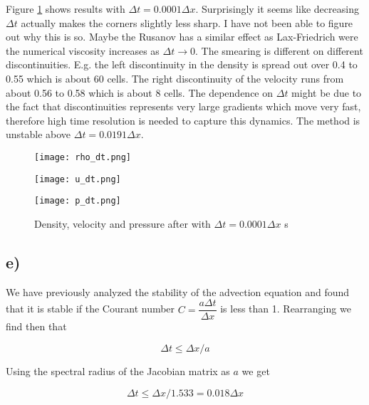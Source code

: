 \documentclass{article}
\begin{document}
Figure \ref{fig:dt} shows results with $\Delta t = 0.0001\Delta x$. Surprisingly it seems like decreasing $\Delta t$ actually makes the corners slightly less sharp. I have not been able to figure out why this is so. Maybe the Rusanov has a similar effect as Lax-Friedrich were the numerical viscosity increases as $\Delta t \rightarrow 0$. The smearing is different on different discontinuities. E.g. the left discontinuity in the density is spread out over 0.4 to 0.55 which is about 60 cells. The right discontinuity of the velocity runs from about 0.56 to 0.58 which is about 8 cells. The dependence on $\Delta t$ might be due to the fact that discontinuities represents very large gradients which move very fast, therefore high time resolution is needed to capture this dynamics. The method is unstable above $\Delta t = 0.0191\Delta x$.

\begin{figure}
	\centering
	\begin{minipage}{0.45\textwidth}
		\texttt{[image: rho\_dt.png]}
	\end{minipage} \hfill
	\begin{minipage}{0.45\textwidth}
		\texttt{[image: u\_dt.png]}
	\end{minipage}	
	\begin{minipage}{0.45\textwidth}
		\texttt{[image: p\_dt.png]}
	\end{minipage}
	\caption{Density, velocity and pressure after with $\Delta t = 0.0001\Delta x$ s}
	\label{fig:dt}
\end{figure}

\subsection{e)}
We have previously analyzed the stability of the advection equation and found that it is stable if the Courant number $C = \dfrac{a\Delta t}{\Delta x}$ is less than 1. Rearranging we find then that

\begin{equation}
\Delta t \leq \Delta x / a
\end{equation}

Using the spectral radius of the Jacobian matrix as $a$ we get

\begin{equation}
\Delta t \leq \Delta x / 1.533 = 0.018 \Delta x
\end{equation}
\end{document}
